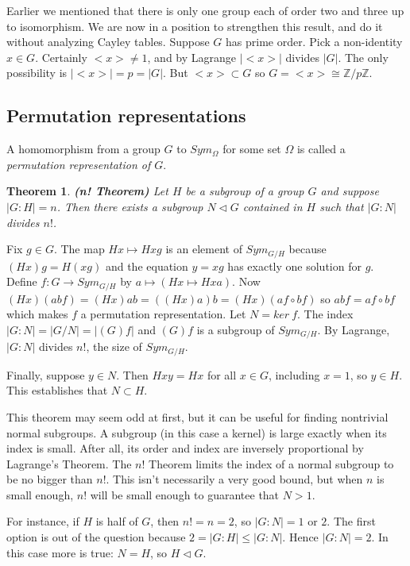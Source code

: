 \documentclass[letterpaper]{article}
\newtheorem{theorem}{Theorem}[section]
\newenvironment{proof}[1][Proof]{\begin{trivlist}
\item[\hskip \labelsep {\bfseries #1}]}{\end{trivlist}}
\begin{document}
Earlier we mentioned that there is only one group each of order two and three up to isomorphism. We are now in a position to strengthen this result, and do it without analyzing Cayley tables. Suppose $G$ has prime order. Pick a non-identity $x \in G$. Certainly ${<}x{>} \ne 1$, and by Lagrange $|{<}x{>}|$ divides $|G|$. The only possibility is $|{<}x{>}| = p = |G|$. But ${<}x{>} \subset G$ so $G = {<}x{>} \cong \mathbb{Z}/p\mathbb{Z}$.

\subsection{Permutation representations}

A homomorphism from a group $G$ to $Sym_\Omega$ for some set $\Omega$ is called a \emph{permutation representation of $G$}.

\begin{theorem}
\emph{\textbf{(n! Theorem)}}
Let $H$ be a subgroup of a group $G$ and suppose $|G\colon H| = n$. Then there exists a subgroup $N \lhd G$ contained in $H$ such that $|G \colon N|$ divides $n!$.
\end{theorem}
\begin{proof}
Fix $g \in G$. The map $Hx \mapsto Hxg$ is an element of $Sym_{G/H}$ because $(Hx)g = H(xg)$ and the equation $y = xg$ has exactly one solution for $g$. Define $f\colon G \rightarrow Sym_{G/H}$ by $a \mapsto (Hx \mapsto Hxa)$. Now $(Hx)(abf) = (Hx)ab = ((Hx)a)b = (Hx)(af \circ bf)$ so $abf = af \circ bf$ which makes $f$ a permutation representation. Let $N = ker\ f$. The index $|G \colon N| = |G/N| = |(G)f|$ and $(G)f$ is a subgroup of $Sym_{G/H}$. By Lagrange, $|G \colon N|$ divides $n!$, the size of $Sym_{G/H}$.

Finally, suppose $y \in N$. Then $Hxy = Hx$ for all $x \in G$, including $x = 1$, so $y \in H$. This establishes that $N \subset H$.
\end{proof}

This theorem may seem odd at first, but it can be useful for finding nontrivial normal subgroups. A subgroup (in this case a kernel) is large exactly when its index is small. After all, its order and index are inversely proportional by Lagrange's Theorem. The $n!$ Theorem limits the index of a normal subgroup to be no bigger than $n!$. This isn't necessarily a very good bound, but when $n$ is small enough, $n!$ will be small enough to guarantee that $N > 1$.

For instance, if $H$ is half of $G$, then $n! = n = 2$, so $|G \colon N| = 1$ or $2$. The first option is out of the question because $2 = |G \colon H| \le |G \colon N|$. Hence $|G \colon N| = 2$. In this case more is true: $N = H$, so $H \lhd G$.
\end{document}
